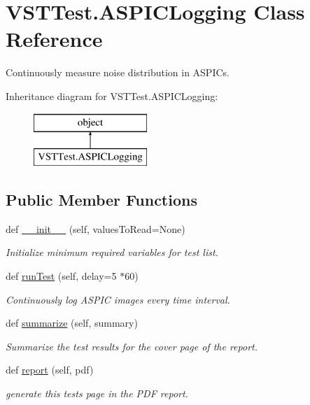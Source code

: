 \hypertarget{class_v_s_t_test_1_1_a_s_p_i_c_logging}{}\section{V\+S\+T\+Test.\+A\+S\+P\+I\+C\+Logging Class Reference}
\label{class_v_s_t_test_1_1_a_s_p_i_c_logging}


Continuously measure noise distribution in A\+S\+P\+I\+Cs.  


Inheritance diagram for V\+S\+T\+Test.\+A\+S\+P\+I\+C\+Logging\+:\begin{figure}[H]
\begin{center}
\leavevmode
\includegraphics[height=2.000000cm]{class_v_s_t_test_1_1_a_s_p_i_c_logging}
\end{center}
\end{figure}
\subsection*{Public Member Functions}
\begin{DoxyCompactItemize}
\item 
def \hyperlink{class_v_s_t_test_1_1_a_s_p_i_c_logging_a4109e19584640be34d9f2249e210bab5}{\+\_\+\+\_\+init\+\_\+\+\_\+} (self, values\+To\+Read=None)
\begin{DoxyCompactList}\small\item\em Initialize minimum required variables for test list. \end{DoxyCompactList}\item 
def \hyperlink{class_v_s_t_test_1_1_a_s_p_i_c_logging_a9917bfa04e1d09b94eb9baaf2ab192ae}{run\+Test} (self, delay=5 $\ast$60)
\begin{DoxyCompactList}\small\item\em Continuously log A\+S\+P\+IC images every time interval. \end{DoxyCompactList}\item 
def \hyperlink{class_v_s_t_test_1_1_a_s_p_i_c_logging_abc0c3f33d4f4e75da2ddfc529b74bf22}{summarize} (self, summary)
\begin{DoxyCompactList}\small\item\em Summarize the test results for the cover page of the report. \end{DoxyCompactList}\item 
def \hyperlink{class_v_s_t_test_1_1_a_s_p_i_c_logging_ad41e35efcd3ec00652c6ea4774101331}{report} (self, pdf)
\begin{DoxyCompactList}\small\item\em generate this test\textquotesingle{}s page in the P\+DF report. \end{DoxyCompactList}\end{DoxyCompactItemize}


